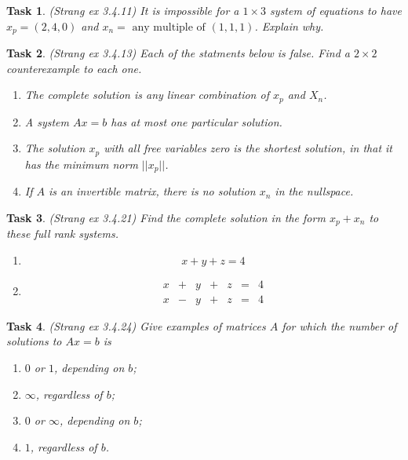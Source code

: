 \documentclass[10pt,]{book}
\theoremstyle{plain}
\numberwithin{equation}{section}
\newtheorem{task}{Task}[chapter]
\begin{document}
\begin{task}
\label{task-102}
(Strang ex 3.4.11)
        It is impossible for a \(1 \times 3\) system of equations to have
        \(x_p = (2,4,0)\) and \(x_n = \text{ any multiple of } (1,1,1)\).
        Explain why.
      \end{task}
\begin{task}
\label{task-103}
(Strang ex 3.4.13)
        Each of the statments below is false. Find a \(2\times 2\) counterexample
        to each one.
        \begin{enumerate}
\item{}
            The complete solution is any linear combination of \(x_p\) and
            \(X_n\).
          \item{}
            A system \(Ax=b\) has at most one particular solution.
          \item{}
            The solution \(x_p\) with all free variables zero is the shortest
            solution, in that it has the minimum norm \(||x_p||\).
          \item{}
            If \(A\) is an invertible matrix, there is no solution \(x_n\)
            in the nullspace.
          \end{enumerate}
\end{task}
\begin{task}
\label{task-104}
(Strang ex 3.4.21)
        Find the complete solution in the form \(x_p + x_n\) to these full
        rank systems.
        \begin{enumerate}
\item{}
            \[ x+y+z = 4\]
          \item{}
            \[
              \begin{array}{ccccccc}
              x & + & y & + & z & = & 4 \\
              x & - & y & + & z & = & 4
              \end{array}
            \]
          \end{enumerate}
\end{task}
\begin{task}
\label{task-105}
(Strang ex 3.4.24)
        Give examples of matrices \(A\) for which the number of solutions
        to \(Ax = b\) is
        \begin{enumerate}
\item{}\(0\) or \(1\), depending on \(b\);\item{}\(\infty\), regardless of \(b\);\item{}\(0\) or \(\infty\), depending on \(b\);\item{}\(1\), regardless of \(b\).\end{enumerate}
\end{task}
\end{document}
